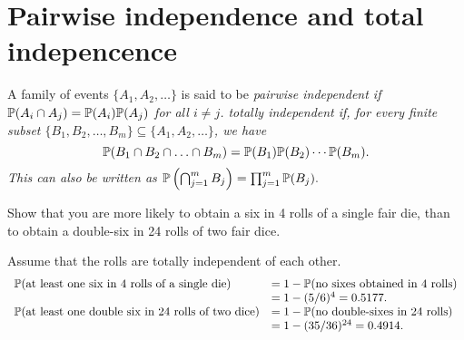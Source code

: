 \section{Pairwise independence and total indepencence}

\begin{definition}
A family of events $\{A_1,A_2,\ldots\}$ is said to be 
\ben
\it \emph{pairwise independent} if $\mathbb{P}(A_i\cap A_j)=\mathbb{P}(A_i)\mathbb{P}(A_j)$ for all $i\neq j$.
\it \emph{totally independent} if, for every finite subset 
$\{B_1,B_2,\ldots,B_m\}\subseteq \{A_1,A_2,\ldots\}$, we have
\[
\mathbb{P}(B_1\cap B_2\cap \ldots \cap B_m) = \mathbb{P}(B_1)\mathbb{P}(B_2)\cdots\mathbb{P}(B_m).
\]
This can also be written as 
$\mathbb{P}\left(\bigcap_{j=1}^m B_j\right) = \prod_{j=1}^m \mathbb{P}(B_j).$
\een
\end{definition}
%

\begin{example}[de M\'{e}r\'{e}'s Paradox]
Show that you are more likely to obtain a six in 4 rolls of a single fair die, than to obtain a double-six in 24 rolls of two fair dice.
\end{example}
\begin{solution}
Assume that the rolls are totally independent of each other.
\[\begin{array}{ll}
\mathbb{P}(\text{at least one six in 4 rolls of a single die)}
	& = 1- \mathbb{P}(\text{no sixes obtained in 4 rolls}) \\
	& = 1 - (5/6)^4 = 0.5177. \\
\mathbb{P}(\text{at least one double six in 24 rolls of two dice}) 
	& = 1- \mathbb{P}(\text{no double-sixes in 24 rolls}) \\
	& = 1 - (35/36)^{24}  = 0.4914. 
\end{array}\]
\end{solution}


